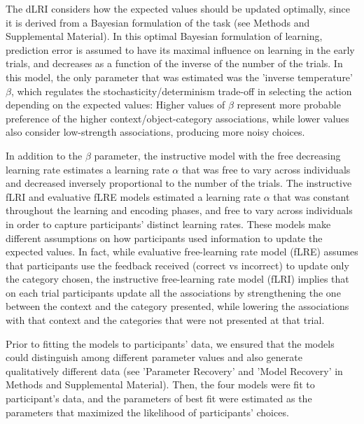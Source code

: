\documentclass[a4paper,12pt]{article}
\begin{document}
The dLRI considers how the expected values should be updated optimally, since it is derived from a Bayesian formulation of the task (see Methods and Supplemental Material). In this optimal Bayesian formulation of learning, prediction error is assumed to have its maximal influence on learning in the early trials, and decreases as a function of the inverse of the number of the trials. In this model, the only parameter that was estimated was the 'inverse temperature' $\beta$, which regulates the stochasticity/determinism trade-off in selecting the action depending on the expected values: Higher values of $\beta$ represent more probable preference of the higher context/object-category associations, while lower values also consider low-strength associations, producing more noisy choices. \par
In addition to the $\beta$ parameter, the instructive model with the free decreasing learning rate estimates a learning rate $\alpha$ that was free to vary across individuals and decreased inversely proportional to the number of the trials. The instructive fLRI and evaluative fLRE models estimated a learning rate $\alpha$ that was constant throughout the learning and encoding phases, and free to vary across individuals in order to capture participants' distinct learning rates. These models make different assumptions on how participants used information to update the expected values. In fact, while evaluative free-learning rate model (fLRE) assumes that participants use the feedback received (correct vs incorrect) to update only the category chosen, the instructive free-learning rate model (fLRI) implies that on each trial participants update all the associations by strengthening the one between the context and the category presented, while lowering the associations with that context and the categories that were not presented at that trial. \par
Prior to fitting the models to participants' data, we ensured that the models could distinguish among different parameter values and also generate qualitatively different data (see 'Parameter Recovery' and 'Model Recovery' in Methods and Supplemental Material). Then, the four models were fit to participant's data, and the parameters of best fit were estimated as the parameters that maximized the likelihood of participants' choices. 
\end{document}
